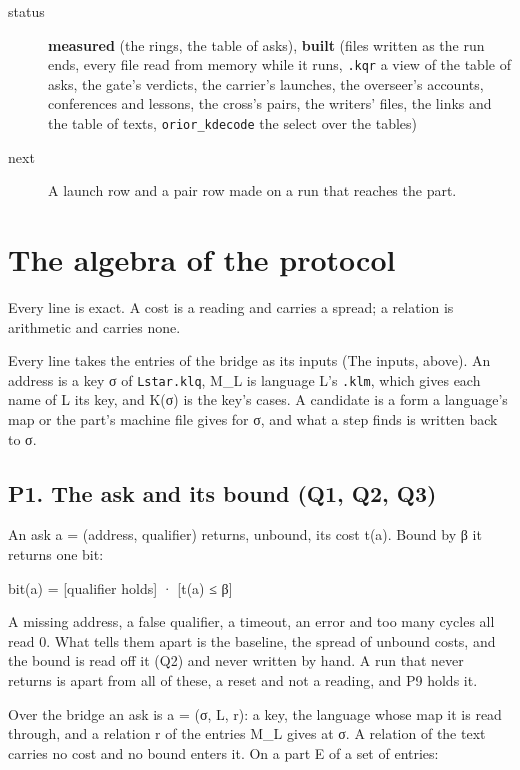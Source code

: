 \begin{description}
\item[{status}] \textbf{measured} (the rings, the table of asks), \textbf{built} (files written as the run ends, every file read from memory while it runs, \texttt{.\allowbreak{}kqr} a view of the table of asks, the gate's verdicts, the carrier's launches, the overseer's accounts, conferences and lessons, the cross's pairs, the writers' files, the links and the table of texts, \texttt{orior\_\allowbreak{}kdecode} the select over the tables)
\item[{next}] A launch row and a pair row made on a run that reaches the part.
\end{description}

\section{\texorpdfstring{The algebra of the protocol}{The algebra of the protocol}}

Every line is exact. A cost is a reading and carries a spread; a relation is arithmetic and carries none.

Every line takes the entries of the bridge as its inputs (The inputs, above). An address is a key σ of \texttt{Lstar.\allowbreak{}klq}, M\_\allowbreak{}L is language L's \texttt{.\allowbreak{}klm}, which gives each name of L its key, and K(σ) is the key's cases. A candidate is a form a language's map or the part's machine file gives for σ, and what a step finds is written back to σ.

\subsection{\texorpdfstring{P1. The ask and its bound (Q1, Q2, Q3)}{P1. The ask and its bound (Q1, Q2, Q3)}}

An ask a = (address, qualifier) returns, unbound, its cost t(a). Bound by β it returns one bit:

bit(a) = [qualifier holds] · [t(a) ≤ β]

A missing address, a false qualifier, a timeout, an error and too many cycles all read 0. What tells them apart is the baseline, the spread of unbound costs, and the bound is read off it (Q2) and never written by hand. A run that never returns is apart from all of these, a reset and not a reading, and P9 holds it.

Over the bridge an ask is a = (σ, L, r): a key, the language whose map it is read through, and a relation r of the entries M\_\allowbreak{}L gives at σ. A relation of the text carries no cost and no bound enters it. On a part E of a set of entries:

